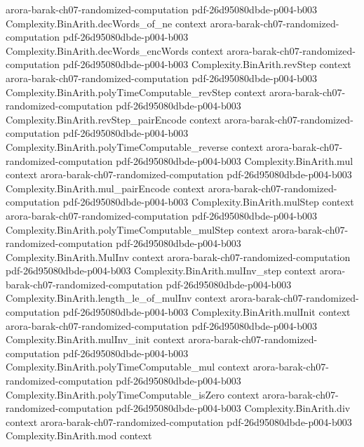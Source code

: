 \begin{theorem}
  {arora-barak-ch07-randomized-computation}
  {pdf-26d95080dbde-p004-b003}
\proofstep
  {Complexity.BinArith.decWords_of_ne}
  {context}
  {arora-barak-ch07-randomized-computation}
  {pdf-26d95080dbde-p004-b003}
\proofstep
  {Complexity.BinArith.decWords_encWords}
  {context}
  {arora-barak-ch07-randomized-computation}
  {pdf-26d95080dbde-p004-b003}
\proofstep
  {Complexity.BinArith.revStep}
  {context}
  {arora-barak-ch07-randomized-computation}
  {pdf-26d95080dbde-p004-b003}
\proofstep
  {Complexity.BinArith.polyTimeComputable_revStep}
  {context}
  {arora-barak-ch07-randomized-computation}
  {pdf-26d95080dbde-p004-b003}
\proofstep
  {Complexity.BinArith.revStep_pairEncode}
  {context}
  {arora-barak-ch07-randomized-computation}
  {pdf-26d95080dbde-p004-b003}
\proofstep
  {Complexity.BinArith.polyTimeComputable_reverse}
  {context}
  {arora-barak-ch07-randomized-computation}
  {pdf-26d95080dbde-p004-b003}
\proofstep
  {Complexity.BinArith.mul}
  {context}
  {arora-barak-ch07-randomized-computation}
  {pdf-26d95080dbde-p004-b003}
\proofstep
  {Complexity.BinArith.mul_pairEncode}
  {context}
  {arora-barak-ch07-randomized-computation}
  {pdf-26d95080dbde-p004-b003}
\proofstep
  {Complexity.BinArith.mulStep}
  {context}
  {arora-barak-ch07-randomized-computation}
  {pdf-26d95080dbde-p004-b003}
\proofstep
  {Complexity.BinArith.polyTimeComputable_mulStep}
  {context}
  {arora-barak-ch07-randomized-computation}
  {pdf-26d95080dbde-p004-b003}
\proofstep
  {Complexity.BinArith.MulInv}
  {context}
  {arora-barak-ch07-randomized-computation}
  {pdf-26d95080dbde-p004-b003}
\proofstep
  {Complexity.BinArith.mulInv_step}
  {context}
  {arora-barak-ch07-randomized-computation}
  {pdf-26d95080dbde-p004-b003}
\proofstep
  {Complexity.BinArith.length_le_of_mulInv}
  {context}
  {arora-barak-ch07-randomized-computation}
  {pdf-26d95080dbde-p004-b003}
\proofstep
  {Complexity.BinArith.mulInit}
  {context}
  {arora-barak-ch07-randomized-computation}
  {pdf-26d95080dbde-p004-b003}
\proofstep
  {Complexity.BinArith.mulInv_init}
  {context}
  {arora-barak-ch07-randomized-computation}
  {pdf-26d95080dbde-p004-b003}
\proofstep
  {Complexity.BinArith.polyTimeComputable_mul}
  {context}
  {arora-barak-ch07-randomized-computation}
  {pdf-26d95080dbde-p004-b003}
\proofstep
  {Complexity.BinArith.polyTimeComputable_isZero}
  {context}
  {arora-barak-ch07-randomized-computation}
  {pdf-26d95080dbde-p004-b003}
\proofstep
  {Complexity.BinArith.div}
  {context}
  {arora-barak-ch07-randomized-computation}
  {pdf-26d95080dbde-p004-b003}
\proofstep
  {Complexity.BinArith.mod}
  {context}

\end{theorem}
